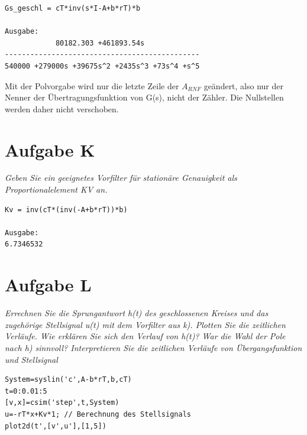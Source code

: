 \begin{lstlisting}[caption = Übertragungsfunktion des geschlossenen Regelkreises, captionpos = b, label = lst:example]
Gs_geschl = cT*inv(s*I-A+b*rT)*b
    
Ausgabe:
            80182.303 +461893.54s               
----------------------------------------------  
540000 +279000s +39675s^2 +2435s^3 +73s^4 +s^5 
\end{lstlisting}
\noindent Mit der Polvorgabe wird nur die letzte Zeile  der $A_{RNF}$ geändert, also nur der Nenner der Übertragungsfunktion von G(s), nicht der Zähler. Die Nullstellen werden daher nicht verschoben.


\clearpage
\section{Aufgabe K}
\textit{Geben Sie ein geeignetes Vorfilter für stationäre Genauigkeit als Proportionalelement KV an.}
 
\begin{lstlisting}[caption = Vorfilter, captionpos = b, label = lst:example]
Kv = inv(cT*(inv(-A+b*rT))*b)
    
Ausgabe:
6.7346532
\end{lstlisting}
\noindent 





\section{Aufgabe L}
\textit{Errechnen Sie die Sprungantwort h(t) des geschlossenen Kreises und das zugehörige Stellsignal u(t) mit dem Vorfilter aus k). Plotten Sie die zeitlichen Verläufe. Wie erklären Sie sich den Verlauf von h(t)? War die Wahl der Pole nach h) sinnvoll?
Interpretieren Sie die zeitlichen Verläufe von Übergangsfunktion und Stellsignal}
 
\begin{lstlisting}[caption = Sprungantwort h(t) des geschlossenen Kreises, captionpos = b, label = lst:example]
System=syslin('c',A-b*rT,b,cT) 
t=0:0.01:5
[v,x]=csim('step',t,System)
u=-rT*x+Kv*1; // Berechnung des Stellsignals
plot2d(t',[v',u'],[1,5])\end{lstlisting}

